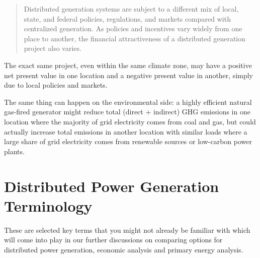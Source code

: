 \documentclass[10pt]{article}
\begin{document}
\begin{quote}
    Distributed generation systems are subject to a different mix of local, state, and federal policies, regulations, and markets compared with centralized generation. As policies and incentives vary widely from one place to another, the financial attractiveness of a distributed generation project also varies. \cite{noauthor_2015-jm}
\end{quote}

The exact same project, even within the same climate zone, may have a positive net present value in one location and a negative present value in another, simply due to local policies and markets.

The same thing can happen on the environmental side: a highly efficient natural gas-fired generator might reduce total (direct + indirect) GHG emissions in one location where the majority of grid electricity comes from coal and gas, but could actually increase total emissions in another location with similar loads where a large share of grid electricity comes from renewable sources or low-carbon power plants.

\section{Distributed Power Generation Terminology}
\label{dgdefs}

These are selected key terms that you might not already be familiar with which will come into play in our further discussions on comparing options for distributed power generation, economic analysis and primary energy analysis.
\end{document}
